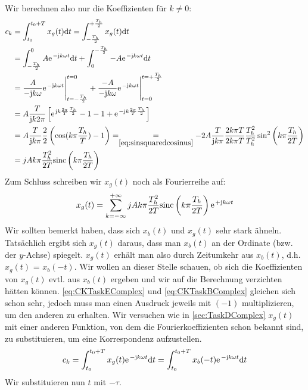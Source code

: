 \documentclass[11pt,a4paper,DIV=12]{scrartcl}
\newcommand{\sinc}{\mathrm{sinc}}
\begin{document}
%
Wir berechnen also nur die Koeffizienten für $k\neq0$:
%
%
%
\begin{align}
	c_k&=\int_{t_0}^{t_0+T}x_{g}(t)\diff t
	=\int_{-\frac{T_h}{2}}^{+\frac{T_h}{2}}x_{g}(t)\diff t \nonumber \\
	&=\int_{-\frac{T_h}{2}}^0A\e^{-\im k \omega t}\diff t+ \int_0^{-\frac{T_h}{2}}-A\e^{-\im k\omega t}\diff t \nonumber \\
	&=\frac{A}{-\im k \omega}\e^{-\im k \omega t}\Bigg |_{t=-\frac{T_h}{2}}^{t=0}+\frac{-A}{-\im k \omega }\e^{-\im k \omega t}\Bigg |_{t=0}^{t=+\frac{T_h}{2}}\nonumber \\
	&=A\frac{T}{\im k2\pi}\left [\e^{\im k \frac{2\pi}{T} \frac{T_h}{2}}-1-1+\e^{-\im k \frac{2\pi}{T} \frac{T_h}{2}}\right ] \nonumber \\
	\label{eq:CKTaskEComplex}
	&=A\frac{T}{\im k\pi}\frac{2}{2}\left (\cos(k\pi\frac{T_h}{T})-1\right )
	=\underset{\ref{eq:sinsquaredcosinus}}{=}-2A\frac{T}{\im k\pi}\frac{2k\pi T}{2k\pi T}\frac{T_h^2}{T_h^2}\sin^2\left(k\pi\frac{T_h}{2T}\right)\nonumber\\
	&=jAk\pi \frac{T_h^2}{2T}\sinc\left(k\pi\frac{T_h}{2T}\right)
\end{align}
%
%
%
Zum Schluss schreiben wir $x_{g}(t)$ noch als Fourierreihe auf:
%
\begin{align}
	x_{g}(t)=\sum_{k=-\infty}^{+\infty}jAk\pi\frac{T_h^2}{2T}\sinc\left(k\pi\frac{T_h}{2T}\right)\e^{+\im k \omega t}
\end{align}
%
Wir sollten bemerkt haben, dass sich $x_{b}(t)$ und $x_{g}(t)$ sehr stark
ähneln.
%
Tatsächlich ergibt sich $x_{g}(t)$ daraus, dass man $x_{b}(t)$ an der Ordinate
(bzw. der $y$-Achse) spiegelt.
%
$x_{g}(t)$ erhält man also durch Zeitumkehr aus $x_{b}(t)$, d.h. $x_{g}(t)$ =
$x_{b}(-t)$.
%
Wir wollen an dieser Stelle schauen, ob sich die Koeffizienten von $x_{g}(t)$
evtl. aus $x_{b}(t)$ ergeben und wir auf die Berechnung verzichten hätten
können.
%
\eqref{eq:CKTaskEComplex} und \eqref{eq:CKTaskBComplex} gleichen sich schon
sehr, jedoch muss man einen Ausdruck jeweils mit $(-1)$ multiplizieren, um den
anderen zu erhalten.
%
Wir versuchen wie in \ref{sec:TaskDComplex} $x_{g}(t)$ mit einer anderen
Funktion, von dem die Fourierkoeffizienten schon bekannt sind, zu
substituieren, um eine Korrespondenz aufzustellen.
%
\begin{align}
	c_k=\int_{t_0}^{t_0+T}x_{g}(t)\e^{-\im k \omega t}\diff t
	= \int_{t_0}^{t_0+T}x_{b}(-t)\e^{-\im k \omega t}\diff t
\end{align}
%
Wir substituieren nun $t$ mit $-\tau$.
\end{document}
